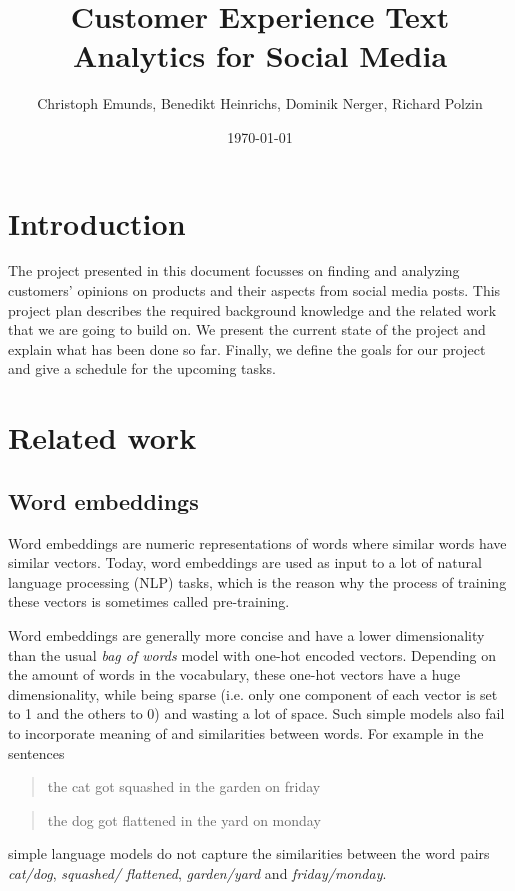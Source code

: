 \documentclass[10pt,a4paper]{article}
\title{{\Huge Customer Experience Text Analytics for Social Media}}
\author{Christoph Emunds, Benedikt Heinrichs, Dominik Nerger, Richard Polzin}
\date{\today}
\begin{document}
	\maketitle
	
	\section{Introduction}
	The project presented in this document focusses on finding and analyzing customers' opinions on products and their aspects from social media posts. This project plan describes the required background knowledge and the related work that we are going to build on. We present the current state of the project and explain what has been done so far. Finally, we define the goals for our project and give a schedule for the upcoming tasks.
	
	\section{Related work}
		\subsection{Word embeddings}
		Word embeddings are numeric representations of words where similar words have similar vectors. Today, word embeddings are used as input to a lot of natural language processing (NLP) tasks, which is the reason why the process of training these vectors is sometimes called pre-training.
		
		Word embeddings are generally more concise and have a lower dimensionality than the usual \textit{bag of words} model with one-hot encoded vectors. Depending on the amount of words in the vocabulary, these one-hot vectors have a huge dimensionality, while being sparse (i.e. only one component of each vector is set to 1 and the others to 0) and wasting a lot of space. Such simple models also fail to incorporate meaning of and similarities between words. For example in the sentences
		\begin{quote}
			the cat got squashed in the garden on friday
		\end{quote}
		\begin{quote}
			the dog got flattened in the yard on monday
		\end{quote}
		simple language models do not capture the similarities between the word pairs \textit{cat/dog}, \textit{squashed/ flattened}, \textit{garden/yard} and \textit{friday/monday}.
		
\end{document}
